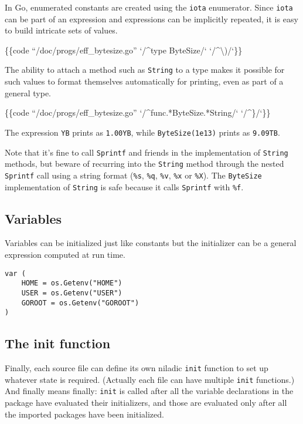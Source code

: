 In Go, enumerated constants are created using the \texttt{iota}
enumerator. Since \texttt{iota} can be part of an expression and
expressions can be implicitly repeated, it is easy to build intricate
sets of values.

\{\{code ``/doc/progs/eff\_bytesize.go'' `/\^{}type ByteSize/`
`/\^{}\textbackslash{})/`\}\}

The ability to attach a method such as \texttt{String} to a type makes
it possible for such values to format themselves automatically for
printing, even as part of a general type.

\{\{code ``/doc/progs/eff\_bytesize.go'' `/\^{}func.*ByteSize.*String/`
`/\^{}\}/`\}\}

The expression \texttt{YB} prints as \texttt{1.00YB}, while
\texttt{ByteSize(1e13)} prints as \texttt{9.09TB}.

Note that it's fine to call \texttt{Sprintf} and friends in the
implementation of \texttt{String} methods, but beware of recurring into
the \texttt{String} method through the nested \texttt{Sprintf} call
using a string format (\texttt{\%s}, \texttt{\%q}, \texttt{\%v},
\texttt{\%x} or \texttt{\%X}). The \texttt{ByteSize} implementation of
\texttt{String} is safe because it calls \texttt{Sprintf} with
\texttt{\%f}.

\subsection*{Variables}

Variables can be initialized just like constants but the initializer can
be a general expression computed at run time.

\begin{Verbatim}[frame=single]
var (
    HOME = os.Getenv("HOME")
    USER = os.Getenv("USER")
    GOROOT = os.Getenv("GOROOT")
)
\end{Verbatim}

\subsection*{The init function}

Finally, each source file can define its own niladic \texttt{init}
function to set up whatever state is required. (Actually each file can
have multiple \texttt{init} functions.) And finally means finally:
\texttt{init} is called after all the variable declarations in the
package have evaluated their initializers, and those are evaluated only
after all the imported packages have been initialized.

